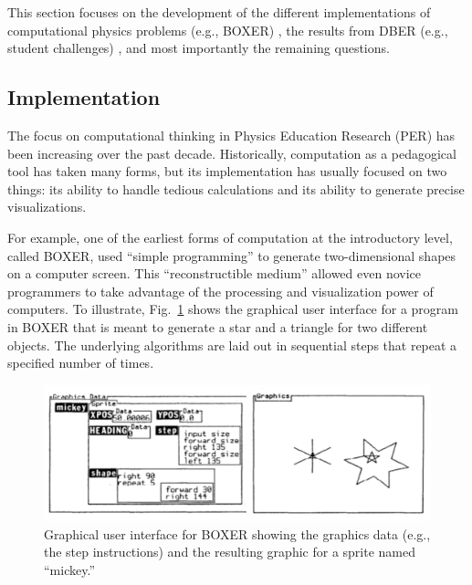 \documentclass{msuphddissertation}
\begin{document}
\begin{doublespace}
This section focuses on the development of the different implementations of computational physics problems (e.g., BOXER) \cite{DiSessa1986,Redish1992,Chonacky2008,McIntyre2008}, the results from DBER (e.g., student challenges) \cite{Chabay2008,Buffler2008,Belloni2008,Hoover2008,Cook2008,Weiman2008}, and most importantly the remaining questions.

\subsection{Implementation}

The focus on computational thinking in Physics Education Research (PER) has been increasing over the past decade.  Historically, computation as a pedagogical tool has taken many forms, but its implementation has usually focused on two things: its ability to handle tedious calculations and its ability to generate precise visualizations.

For example, one of the earliest forms of computation at the introductory level, called BOXER, used ``simple programming'' to generate two-dimensional shapes on a computer screen.  This ``reconstructible medium'' allowed even novice programmers to take advantage of the processing and visualization power of computers.  To illustrate, Fig.~\ref{CH2:BOXER} shows the graphical user interface for a program in BOXER that is meant to generate a star and a triangle for two different objects.  The underlying algorithms are laid out in sequential steps that repeat a specified number of times.

\begin{figure}\center
\includegraphics[scale=0.75]{images/CH2BOXER.pdf}
\caption{Graphical user interface for BOXER showing the graphics data (e.g., the step instructions) and the resulting graphic for a sprite named ``mickey.''}\label{CH2:BOXER}
\end{figure}


\end{doublespace}
\end{document}
